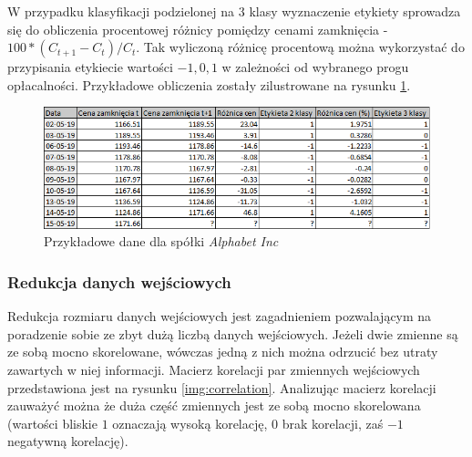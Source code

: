 \documentclass[a4paper, twoside, 11pt, openright]{article}
\begin{document}
 W przypadku klasyfikacji podzielonej na 3 klasy wyznaczenie etykiety sprowadza się do obliczenia procentowej różnicy pomiędzy cenami zamknięcia - $100*(C_{t+1}-C_t)/C_t$. Tak wyliczoną różnicę procentową można wykorzystać do przypisania etykiecie wartości $-1, 0, 1$ w zależności od wybranego progu opłacalności. Przykładowe obliczenia zostały zilustrowane na rysunku \ref{img:classification_label_creation}.

\begin{figure}[H]
\centering 
\includegraphics[scale=0.9]{img/label_creation3.png}
\caption{Przykładowe dane dla spółki \textit{Alphabet Inc}}
\label{img:classification_label_creation}
\end{figure}

\subsubsection{Redukcja danych wejściowych}

Redukcja rozmiaru danych wejściowych jest zagadnieniem pozwalającym na poradzenie sobie ze zbyt dużą liczbą danych wejściowych. Jeżeli dwie zmienne są ze sobą mocno skorelowane, wówczas jedną z nich można odrzucić bez utraty zawartych w niej informacji. Macierz korelacji par zmiennych wejściowych przedstawiona jest na rysunku \ref{img:correlation}. Analizując macierz korelacji zauważyć można że duża część zmiennych jest ze sobą mocno skorelowana (wartości bliskie $1$ oznaczają wysoką korelację, 0 brak korelacji, zaś $-1$ negatywną korelację).
\end{document}
